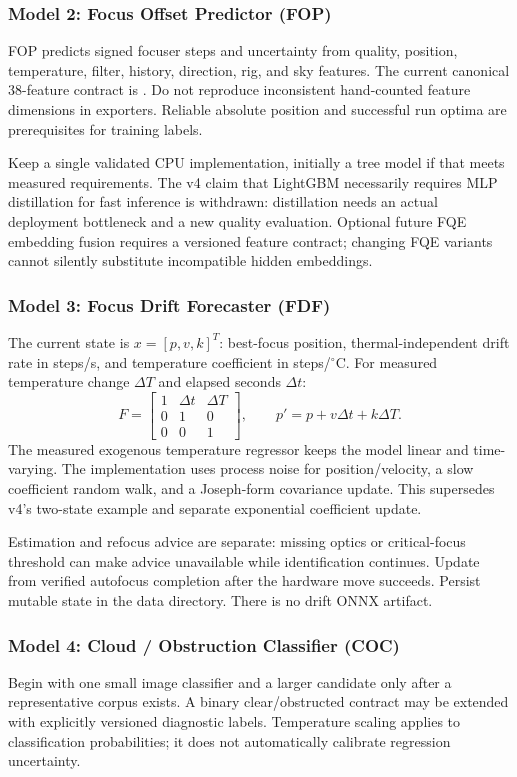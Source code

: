 \documentclass[11pt,a4paper]{article}
\newcommand{\pathref}[1]{\texttt{\path{#1}}}
\begin{document}
\subsubsection{Model 2: Focus Offset Predictor (FOP)}
FOP predicts signed focuser steps and uncertainty from quality, position,
temperature, filter, history, direction, rig, and sky features. The current
canonical 38-feature contract is \pathref{ml/contracts/fop_features.py}.
Do not reproduce inconsistent hand-counted feature dimensions in exporters.
Reliable absolute position and successful run optima are prerequisites for
training labels.

Keep a single validated CPU implementation, initially a tree model if that
meets measured requirements. The v4 claim that LightGBM necessarily requires
MLP distillation for fast inference is withdrawn: distillation needs an actual
deployment bottleneck and a new quality evaluation. Optional future FQE
embedding fusion requires a versioned feature contract; changing FQE variants
cannot silently substitute incompatible hidden embeddings.

\subsubsection{Model 3: Focus Drift Forecaster (FDF)}
The current state is $x=[p,v,k]^T$: best-focus position, thermal-independent
drift rate in steps/s, and temperature coefficient in steps/$^\circ$C.
For measured temperature change $\Delta T$ and elapsed seconds $\Delta t$:
\[
F=\begin{bmatrix}1&\Delta t&\Delta T\\0&1&0\\0&0&1\end{bmatrix},
\qquad p'=p+v\Delta t+k\Delta T.
\]
The measured exogenous temperature regressor keeps the model linear and
time-varying. The implementation uses process noise for position/velocity,
a slow coefficient random walk, and a Joseph-form covariance update. This
supersedes v4's two-state example and separate exponential coefficient update.

Estimation and refocus advice are separate: missing optics or critical-focus
threshold can make advice unavailable while identification continues.
Update from verified autofocus completion after the hardware move succeeds.
Persist mutable state in the data directory. There is no drift ONNX artifact.

\subsubsection{Model 4: Cloud / Obstruction Classifier (COC)}
Begin with one small image classifier and a larger candidate only after a
representative corpus exists. A binary clear/obstructed contract may be extended
with explicitly versioned diagnostic labels. Temperature scaling applies to
classification probabilities; it does not automatically calibrate regression
uncertainty\cite{guo}.
\end{document}
